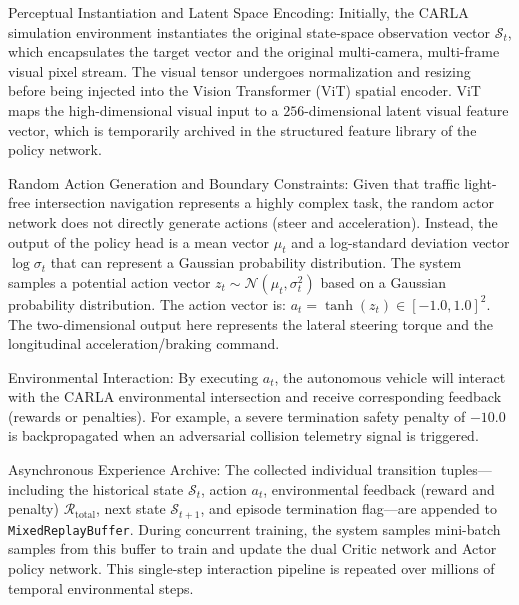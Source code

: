    Perceptual Instantiation and Latent Space Encoding: Initially, the CARLA simulation environment instantiates the original state-space observation vector $\mathcal{S}_t$, which encapsulates the target vector and the original multi-camera, multi-frame visual pixel stream. The visual tensor undergoes normalization and resizing before being injected into the Vision Transformer (ViT) spatial encoder. ViT maps the high-dimensional visual input to a $256$-dimensional latent visual feature vector, which is temporarily archived in the structured feature library of the policy network.

    Random Action Generation and Boundary Constraints: Given that traffic light-free intersection navigation represents a highly complex task, the random actor network does not directly generate actions (steer and acceleration). Instead, the output of the policy head is a mean vector $\mu_t$ and a log-standard deviation vector $\log\sigma_t$ that can represent a Gaussian probability distribution. The system samples a potential action vector $z_t \sim \mathcal{N}(\mu_t, \sigma_t^2)$ based on a Gaussian probability distribution. The action vector is: $a_t = \tanh(z_t) \in [-1.0, 1.0]^2$. The two-dimensional output here represents the lateral steering torque and the longitudinal acceleration/braking command.

    Environmental Interaction: By executing $a_t$, the autonomous vehicle will interact with the CARLA environmental intersection and receive corresponding feedback (rewards or penalties). For example, a severe termination safety penalty of $-10.0$ is backpropagated when an adversarial collision telemetry signal is triggered.

    Asynchronous Experience Archive: The collected individual transition tuples—including the historical state $\mathcal{S}_t$, action $a_t$, environmental feedback (reward and penalty) $\mathcal{R}_{\text{total}}$, next state $\mathcal{S}_{t+1}$, and episode termination flag—are appended to \texttt{MixedReplayBuffer}. During concurrent training, the system samples mini-batch samples from this buffer to train and update the dual Critic network and Actor policy network. This single-step interaction pipeline is repeated over millions of temporal environmental steps.
    
